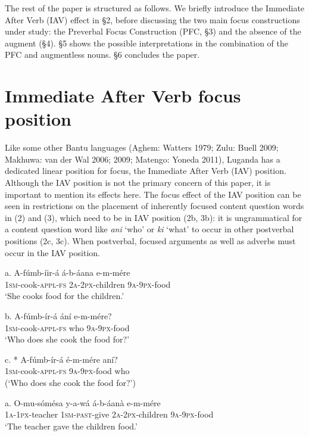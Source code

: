 \documentclass[output=paper]{langsci/langscibook}
\begin{document}
  The rest of the paper is structured as follows. We briefly introduce the Immediate After Verb (IAV) effect in §2, before discussing the two main focus constructions under study: the Preverbal Focus Construction (PFC, §3) and the absence of the augment (§4). §5 shows the possible interpretations in the combination of the PFC and augmentless nouns. §6 concludes the paper.

 \section{Immediate After Verb focus position}

Like some other Bantu languages (Aghem: Watters 1979; Zulu: Buell 2009; Makhuwa: van der Wal 2006; 2009; Matengo: Yoneda 2011), Luganda has a dedicated linear position for focus, the Immediate After Verb (IAV) position. Although the IAV position is not the primary concern of this paper, it is important to mention its effects here. The focus effect of the IAV position can be seen in restrictions on the placement of inherently focused content question words in (2) and (3), which need to be in IAV position (2b, 3b): it is ungrammatical for a content question word like \textit{ani} ‘who’ or \textit{ki} ‘what’ to occur in other postverbal positions (2c, 3c). When postverbal, focused arguments as well as adverbs must occur in the IAV position.

\ea
\gll a.  A-fúmb-íir-á    á-b-áana    e-m-mére\\
       \textsc{1sm}{}-cook-\textsc{appl}{}-\textsc{fs}  \textsc{2a}{}-\textsc{2px}{}-children  \textsc{9a}{}-\textsc{9px}{}-food\\
\glt   ‘She cooks food for the children.’
\z

\ea
\gll b.  A-fúmb-ír-á    ání  e-m-mére?\\
       \textsc{1sm}{}-cook-\textsc{appl}{}-\textsc{fs}  who  \textsc{9a}{}-\textsc{9px}{}-food\\
\glt   ‘Who does she cook the food for?’
\z

\ea
\gll c.  * A-fúmb-ír-á  é-m-mére   aní?\\
       \textsc{1sm}{}-cook-\textsc{appl}{}-\textsc{fs}  \textsc{9a-9px}{}-food  who\\
\glt   (‘Who does she cook the food for?’)
\z

\ea
\gll a.  O-mu-sómésa  y-a-wá     á-b-áanà    e-m-mére\\
       \textsc{1a-1px}{}-teacher  \textsc{1sm-past}{}-give  \textsc{2a-2px}{}-children  \textsc{9a}{}-\textsc{9px}{}-food\\
\glt   ‘The teacher gave the children food.’
\z
\end{document}
